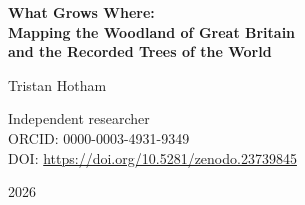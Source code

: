 \documentclass[11pt,a4paper]{article}
\begin{document}
\begin{center}
{\Large\bfseries What Grows Where:\\[2pt] Mapping the Woodland of Great Britain\\[2pt] and the Recorded Trees of the World\par}
\vspace{1.2em}
{\large Tristan Hotham\par}
\vspace{0.3em}
{\small Independent researcher\\
ORCID: 0000-0003-4931-9349\\
DOI: \href{https://doi.org/10.5281/zenodo.23739845}{https://doi.org/10.5281/zenodo.23739845}\par}
\vspace{0.8em}
2026
\end{center}
\end{document}
